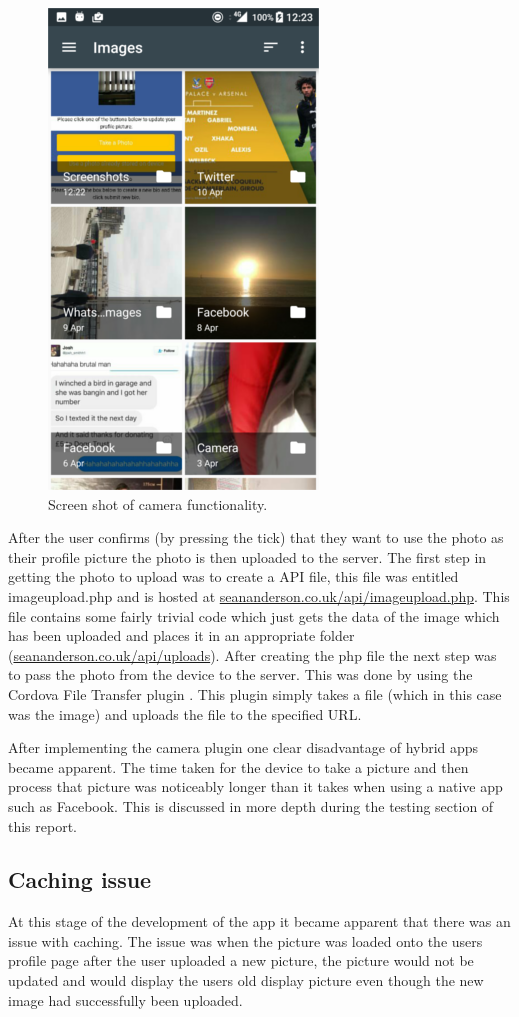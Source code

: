 \begin{center}
\begin{figure}[H]
\includegraphics[scale=0.5]{images/sc9}
\caption{Screen shot of camera functionality.}
\end{figure}
\end{center}

After the user confirms (by pressing the tick) that they want to use the photo as their profile picture the photo is then uploaded to the server. The first step in getting the photo to upload was to create a API file, this file was entitled imageupload.php and is hosted at \url{seananderson.co.uk/api/imageupload.php}. This file contains some fairly trivial code which just gets the data of the image which has been uploaded and places it in an appropriate folder (\url{seananderson.co.uk/api/uploads}). After creating the php file the next step was to pass the photo from the device to the server. This was done by using the Cordova File Transfer plugin \cite{ft}. This plugin simply takes a file (which in this case was the image) and uploads the file to the specified URL.

After implementing the camera plugin one clear disadvantage of hybrid apps became apparent. The time taken for the device to take a picture and then process that picture was noticeably longer than it takes when using a native app such as Facebook. This is discussed in more depth during the testing section of this report. 

\subsection{Caching issue}
At this stage of the development of the app it became apparent that there was an issue with caching. The issue was when the picture was loaded onto the users profile page after the user uploaded a new picture, the picture would not be updated and would display the users old display picture even though the new image had successfully been uploaded. 

